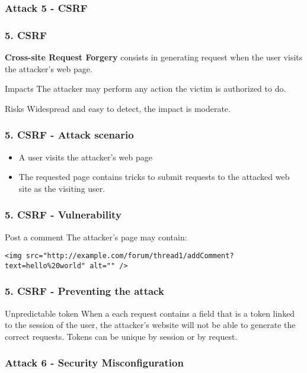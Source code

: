 \subsubsection{Attack 5 - CSRF}

\begin{frame}
\frametitle{5. CSRF}
\textbf{Cross-site Request Forgery} consists in generating request when the
user visits the attacker's web page.
\begin{block}{Impacts}
The attacker may perform any action the victim is authorized to do.
\end{block}
\begin{block}{Risks}
\alert{Widespread} and easy to detect, the impact is moderate.
\end{block}
\end{frame}

\begin{frame}
\frametitle{5. CSRF - Attack scenario}
\begin{itemize}
\item A user visits the attacker's web page
\item The requested page contains tricks to submit requests to the attacked
	web site as the visiting user.
\end{itemize}
\end{frame}

\begin{frame}[fragile]
\frametitle{5. CSRF - Vulnerability}
\begin{exampleblock}{Post a comment}
The attacker's page may contain:
\begin{lstlisting}
<img src="http://example.com/forum/thread1/addComment?
text=hello%20world" alt="" />
\end{lstlisting}
\end{exampleblock}
\end{frame}

\begin{frame}[fragile]
\frametitle{5. CSRF - Preventing the attack}
\begin{block}{Unpredictable token}
When a each request contains a field that is a token linked to the session of
the user, the attacker's website will not be able to generate the correct
requests.
Tokens can be unique by session or by request.
\end{block}
\end{frame}

\subsubsection{Attack 6 - Security Misconfiguration}


